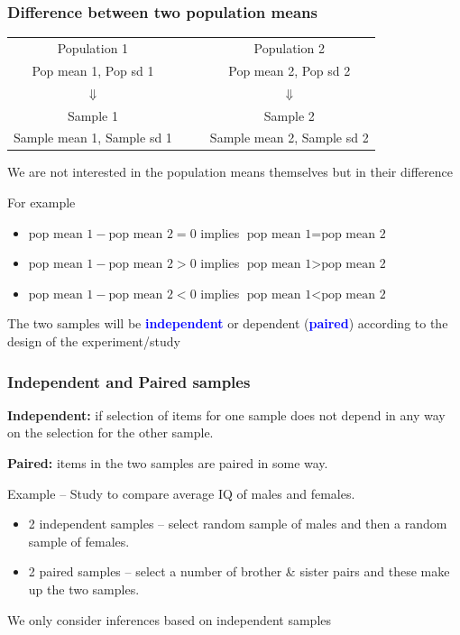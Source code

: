 \documentclass[12pt,xcolor=dvipsnames,handout,mathserif,aspectratio=169]{beamer}
\newcommand{\tcb}{\textcolor{blue}}
\begin{document}
\begin{frame}
\frametitle{Difference between two population means}
\begin{center}
{\small{
\begin{tabular}{cccc}
Population 1	&&& Population	2\\
Pop mean 1, Pop sd 1 &&& Pop mean 2, Pop sd 2\\
$\Downarrow$&&&$\Downarrow$\\
Sample 1	&&& Sample	2\\
Sample mean 1, Sample sd 1 &&& Sample mean 2, Sample sd 2\\
\end{tabular}}}
\end{center}

\vspace*{0.2cm}
We are not interested in the population means themselves but in their difference
\begin{block}{For example}
\begin{itemize}
\item $\mbox{pop mean 1} - \mbox{pop mean 2} = 0$ implies $\mbox{pop mean 1} = \mbox{pop mean 2}$
\item $\mbox{pop mean 1} - \mbox{pop mean 2} > 0$ implies $\mbox{pop mean 1} > \mbox{pop mean 2}$
\item $\mbox{pop mean 1} - \mbox{pop mean 2} < 0$ implies $\mbox{pop mean 1} < \mbox{pop mean 2}$
\end{itemize}
\end{block}

The two samples will be \textbf{\tcb{independent}} or dependent (\textbf{\tcb{paired}}) according to the design of the experiment/study
\end{frame}

\begin{frame}\frametitle{Independent and Paired samples}

\textbf{Independent:} if selection of items for one sample does not depend in any way on the selection for the other sample.

\vspace*{0.2cm}

\textbf{Paired:} items in the two samples are paired in some way.

\vspace*{0.2cm}
\begin{block}{Example -- Study to compare average IQ of males and females.}
\begin{itemize}
\item 2 independent samples -- select random sample of males and then a random sample of females.
\item 2 paired samples -- select a number of brother \& sister pairs and these make up the two samples.
\end{itemize}
\end{block}

We only consider inferences based on independent samples
\end{frame}
\end{document}
